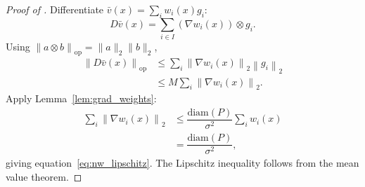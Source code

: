 \documentclass[10pt,a4paper]{amsart}
\newcommand{\diam}{\mathrm{diam}}
\def\eqref#1{equation~\ref{#1}}
\newcommand*{\norm}[1]{\left\|#1\right\|}
\begin{document}
\begin{proof}[Proof of ]
Differentiate $\bar v(x)=\sum_i w_i(x)g_i$:
    \[ D \bar v(x)=\sum_{i\in I} ( \nabla w_i(x) )\otimes g_i.\]
Using $\norm{a \otimes b}_{\mathrm{op}}=\|a\|_2 \|b\|_2$,
    \begin{align*}
       \norm{D \bar v(x)}_{\mathrm{op}} &\le \sum_i \norm{\nabla w_i(x)}_2 \norm{g_i}_2 \\ &\le M \sum_i \norm{\nabla w_i(x)}_2.  
    \end{align*} 
Apply Lemma~\ref{lem:grad_weights}:
    \begin{align*}
        \sum_i \norm{\nabla w_i(x)}_2 &\le \dfrac{\diam(P)}{\sigma^2}\sum_i w_i(x) \\ &= \dfrac{\diam(P)}{\sigma^2}, 
    \end{align*}
giving \eqref{eq:nw_lipschitz}. The Lipschitz inequality follows from the mean value theorem.
\end{proof}
\end{document}
